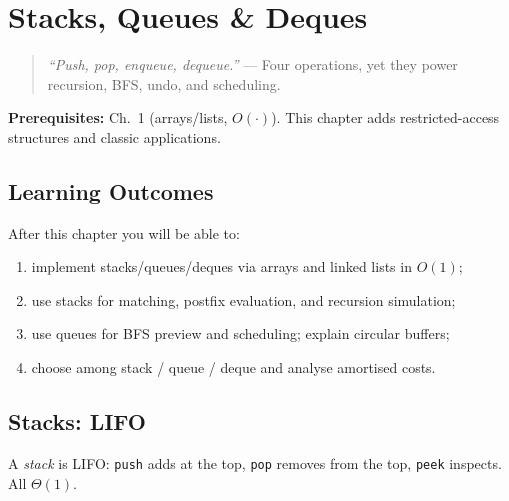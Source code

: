 \chapter{Stacks, Queues \& Deques}
\label{ch:stacks-queues}

\begin{quote}
\emph{``Push, pop, enqueue, dequeue.''} --- Four operations, yet they power recursion, BFS, undo, and scheduling.
\end{quote}

\noindent\textbf{Prerequisites:} Ch.~1 (arrays/lists, $O(\cdot)$). This chapter adds restricted-access structures and classic applications.

\section*{Learning Outcomes}
After this chapter you will be able to:
\begin{enumerate}[label=(L\arabic*)]
    \item implement stacks/queues/deques via arrays and linked lists in $O(1)$;
    \item use stacks for matching, postfix evaluation, and recursion simulation;
    \item use queues for BFS preview and scheduling; explain circular buffers;
    \item choose among stack / queue / deque and analyse amortised costs.
\end{enumerate}

\section{Stacks: LIFO}
\label{sec:stacks}
A \emph{stack} is LIFO: \texttt{push} adds at the top, \texttt{pop} removes from the top, \texttt{peek} inspects. All $\Theta(1)$.

